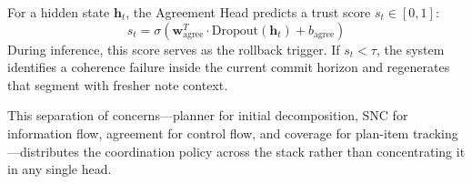 For a hidden state $\mathbf{h}_t$, the Agreement Head predicts a trust score $s_t \in [0, 1]$:
\begin{equation}
    s_t = \sigma(\mathbf{w}_{\text{agree}}^T \cdot \text{Dropout}(\mathbf{h}_t) + b_{\text{agree}})
\end{equation}
During inference, this score serves as the rollback trigger. If $s_t < \tau$, the system identifies a coherence failure inside the current commit horizon and regenerates that segment with fresher note context.

This separation of concerns---planner for initial decomposition, SNC for information flow, agreement for control flow, and coverage for plan-item tracking---distributes the coordination policy across the stack rather than concentrating it in any single head.
